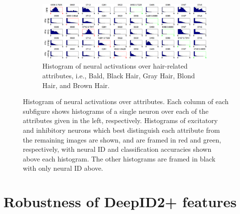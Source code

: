 \documentclass[10pt,twocolumn,letterpaper]{article}
\begin{document}
\begin{figure}[tb!]
\begin{subfigure}{0.98\textwidth}
\includegraphics[width = 0.98\textwidth]{picture/25d.png}
\vspace{-0.06in}
\caption{Histogram of neural activations over hair-related attributes, i.e., Bald, Black Hair, Gray Hair, Blond Hair, and Brown Hair.}
\label{fig:hair}
\vspace{0.0in}
\end{subfigure}

\vspace{-0.05in}
\caption{Histogram of neural activations over attributes. Each column of each subfigure shows histograms of a single neuron over each of the attributes given in the left, respectively. Histograms of excitatory and inhibitory neurons which best distinguish each attribute from the remaining images are shown, and are framed in red and green, respectively, with neural ID and classification accuracies shown above each histogram. The other histograms are framed in black with only neural ID above.}
\vspace{-0.05in}
\label{fig:attr}
\end{figure}

\section{Robustness of DeepID2+ features}
\label{sec:robustness}
\end{document}
